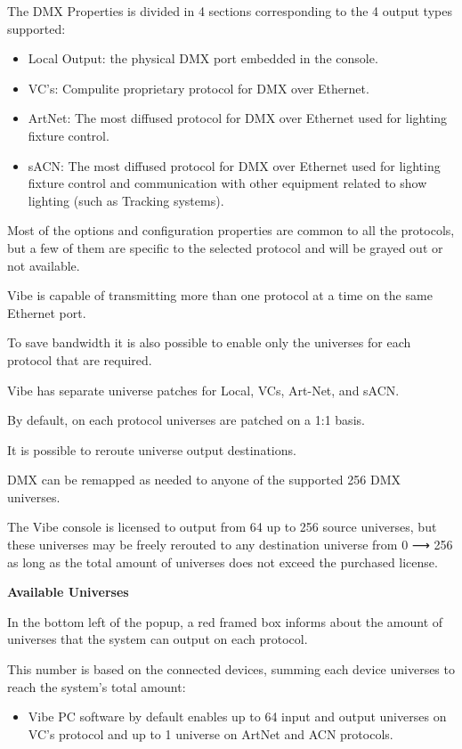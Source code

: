 \documentclass[
]{article}
\providecommand{\tightlist}{%
  \setlength{\itemsep}{0pt}\setlength{\parskip}{0pt}}
\begin{document}
The DMX Properties is divided in 4 sections corresponding to the 4 output types supported:

\begin{itemize}
\item
  Local Output: the physical DMX port embedded in the console.
\item
  VC's: Compulite proprietary protocol for DMX over Ethernet.
\item
  ArtNet: The most diffused protocol for DMX over Ethernet used for lighting fixture control.
\item
  sACN: The most diffused protocol for DMX over Ethernet used for lighting fixture control and communication with other equipment related to show lighting (such as Tracking systems).
\end{itemize}

Most of the options and configuration properties are common to all the protocols, but a few of them are specific to the selected protocol and will be grayed out or not available.

Vibe is capable of transmitting more than one protocol at a time on the same Ethernet port.

To save bandwidth it is also possible to enable only the universes for each protocol that are required.

Vibe has separate universe patches for Local, VCs, Art-Net, and sACN.

By default, on each protocol universes are patched on a 1:1 basis.

It is possible to reroute universe output destinations.

DMX can be remapped as needed to anyone of the supported 256 DMX universes.

The Vibe console is licensed to output from 64 up to 256 source universes, but these universes may be freely rerouted to any destination universe from 0 ⟶ 256 as long as the total amount of universes does not exceed the purchased license.

\textbf{Available Universes}

In the bottom left of the popup, a red framed box informs about the amount of universes that the system can output on each protocol.

This number is based on the connected devices, summing each device universes to reach the system's total amount:

\begin{itemize}
\tightlist
\item
  Vibe PC software by default enables up to 64 input and output universes on VC's protocol and up to 1 universe on ArtNet and ACN protocols.
\end{itemize}
\end{document}
